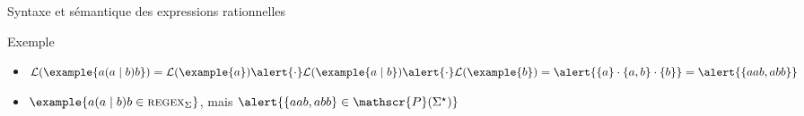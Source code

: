 \begin{frame}{Syntaxe et sémantique des expressions rationnelles}
  \vspace{-2mm}
  \begin{exampleblock}{Exemple}
  \begin{itemize}
    \item\vspace{-1mm} $\mathcal{L}(\example{a (a \mid b) b}) = \mathcal{L}(\example{a}) \alert{\cdot} \mathcal{L}(\example{a \mid b}) \alert{\cdot} \mathcal{L}(\example{b}) = \alert{\{a\} \cdot \{a, b\} \cdot \{b\}}  = \alert{\{aab, abb\}}$
    \item $\example{a (a \mid b) b \in \textsc{regex}_\Sigma}$, mais $\alert{\{aab, abb\} \in \mathscr{P}(\Sigma^\star)}$
    \end{itemize}
  \end{exampleblock}
 
\end{frame}

